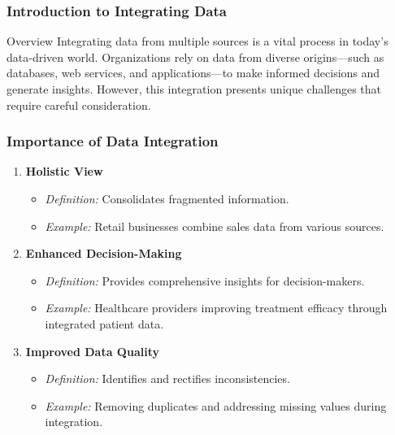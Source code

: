 \documentclass[aspectratio=169]{beamer}
\begin{document}
\frame{\titlepage}

\begin{frame}[fragile]
    \frametitle{Introduction to Integrating Data}
    \begin{block}{Overview}
        Integrating data from multiple sources is a vital process in today's data-driven world. Organizations rely on data from diverse origins—such as databases, web services, and applications—to make informed decisions and generate insights. However, this integration presents unique challenges that require careful consideration.
    \end{block}
\end{frame}

\begin{frame}[fragile]
    \frametitle{Importance of Data Integration}
    \begin{enumerate}
        \item \textbf{Holistic View}
            \begin{itemize}
                \item \textit{Definition:} Consolidates fragmented information.
                \item \textit{Example:} Retail businesses combine sales data from various sources.
            \end{itemize}

        \item \textbf{Enhanced Decision-Making}
            \begin{itemize}
                \item \textit{Definition:} Provides comprehensive insights for decision-makers.
                \item \textit{Example:} Healthcare providers improving treatment efficacy through integrated patient data.
            \end{itemize}

        \item \textbf{Improved Data Quality}
            \begin{itemize}
                \item \textit{Definition:} Identifies and rectifies inconsistencies.
                \item \textit{Example:} Removing duplicates and addressing missing values during integration.
            \end{itemize}
    \end{enumerate}
\end{frame}
\end{document}
